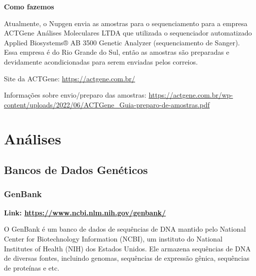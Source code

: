 \documentclass[
  letterpaper,
  DIV=11,
  numbers=noendperiod]{scrreprt}
\begin{document}
\begin{tcolorbox}[enhanced jigsaw, colback=white, toprule=.15mm, rightrule=.15mm, opacityback=0, left=2mm, arc=.35mm, bottomrule=.15mm, breakable, leftrule=.75mm]
\begin{minipage}[t]{5.5mm}
\textcolor{quarto-callout-note-color}{\faInfo}
\end{minipage}%
\begin{minipage}[t]{\textwidth - 5.5mm}

\textbf{Como fazemos}\vspace{2mm}

Atualmente, o Nupgen envia as amostras para o sequenciamento para a
empresa ACTGene Análises Moleculares LTDA que utilizada o sequenciador
automatizado Applied Biosystems® AB 3500 Genetic Analyzer
(sequenciamento de Sanger). Essa empresa é do Rio Grande do Sul, então
as amostras são preparadas e devidamente acondicionadas para serem
enviadas pelos correios.

Site da ACTGene: \url{https://actgene.com.br/}

Informações sobre envio/preparo das amostras:
\url{https://actgene.com.br/wp-content/uploads/2022/06/ACTGene_Guia-preparo-de-amostras.pdf}

\end{minipage}%
\end{tcolorbox}

\part{Análises}

\hypertarget{bancos-de-dados-genuxe9ticos}{%
\chapter{Bancos de Dados Genéticos}\label{bancos-de-dados-genuxe9ticos}}

\hypertarget{genbank}{%
\section{GenBank}\label{genbank}}

\textbf{Link: \href{}{https://www.ncbi.nlm.nih.gov/genbank/}}

O GenBank é um banco de dados de sequências de DNA mantido pelo National
Center for Biotechnology Information (NCBI), um instituto do National
Institutes of Health (NIH) dos Estados Unidos. Ele armazena sequências
de DNA de diversas fontes, incluindo genomas, sequências de expressão
gênica, sequências de proteínas e etc.
\end{document}
